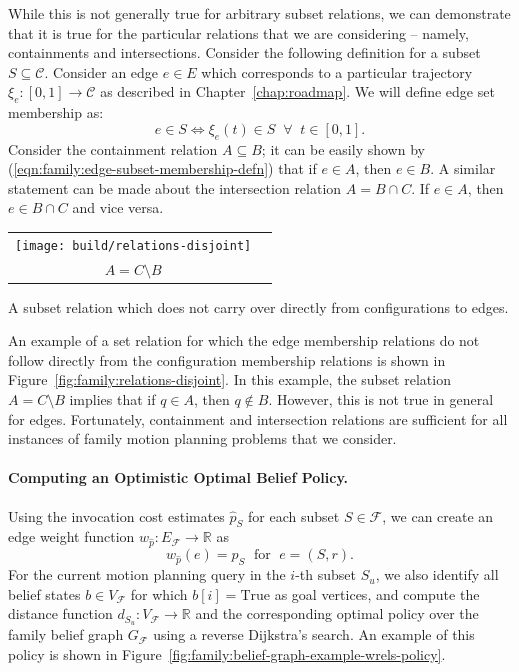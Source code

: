While this is not generally true for arbitrary subset relations,
we can demonstrate that it is true for the particular relations that
we are considering -- namely, containments and intersections.
Consider the following definition
for a subset $S \subseteq \mathcal{C}$.
Consider an edge $e \in E$ which corresponds to a particular trajectory
$\xi_e : [0,1] \rightarrow \mathcal{C}$
as described in Chapter~\ref{chap:roadmap}.
We will define edge set membership as:
\begin{equation}
   e \in S \iff \xi_e(t) \in S \;\;\forall\;\; t \in [0,1].
   \label{eqn:family:edge-subset-membership-defn}
\end{equation}
Consider the containment relation $A \subseteq B$;
it can be easily shown by (\ref{eqn:family:edge-subset-membership-defn})
that if $e \in A$, then $e \in B$.
A similar statement can be made about the intersection relation
$A = B \cap C$.
If $e \in A$, then $e \in B \cap C$ and vice versa.

\begin{marginfigure}
   \centering
   \begin{tabular}{cc}
      \texttt{[image: build/relations-disjoint]} \\
      $A = C \setminus B$ \\
   \end{tabular}
   \caption{A subset relation which does not carry over directly
      from configurations to edges.}
   \label{fig:family:relations-disjoint}
\end{marginfigure}

An example of a set relation for which the edge membership relations
do not follow directly from the configuration membership relations
is shown in Figure~\ref{fig:family:relations-disjoint}.
In this example,
the subset relation $A = C \setminus B$ implies that if $q \in A$,
then $q \notin B$.
However,
this is not true in general for edges.
Fortunately,
containment and intersection relations are sufficient for all
instances of family motion planning problems that we consider.

\paragraph{Computing an Optimistic Optimal Belief Policy.}
Using the invocation cost estimates $\hat{p}_S$
for each subset $S \in \mathcal{F}$,
we can create an edge weight function
$w_{\hat{p}} : E_{\mathcal{F}} \rightarrow \mathbb{R}$ as
\begin{equation}
   w_{\hat{p}}(e) = \hat{p}_S \;\mbox{ for }\; e = (S,r).
\end{equation}
For the current motion planning query in the $i$-th subset $S_u$,
we also identify all belief states $b \in V_{\mathcal{F}}$
for which $b[i] = \mbox{True}$
as goal vertices,
and compute the distance function
$d_{S_u} :  V_{\mathcal{F}} \rightarrow \mathbb{R}$
and the corresponding optimal policy
over the family belief graph $G_{\mathcal{F}}$ using a reverse
Dijkstra's search.
An example of this policy is shown
in Figure~\ref{fig:family:belief-graph-example-wrels-policy}.

